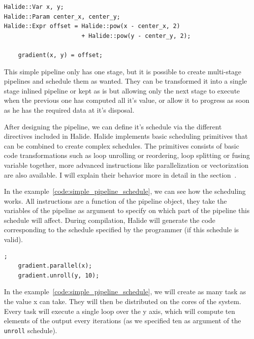 \lstset{basicstyle=\ttfamily\footnotesize,breaklines=true,tabsize=2}
\begin{lstlisting}[caption={Simple Pipeline Example}, captionpos=b, label={code:simple_pipeline}]
Halide::Var x, y;
Halide::Param center_x, center_y;
Halide::Expr offset = Halide::pow(x - center_x, 2) 
                      + Halide::pow(y - center_y, 2);

	gradient(x, y) = offset;
\end{lstlisting}


	This simple pipeline only has one stage, but it is possible to create multi-stage pipelines and schedule them as wanted. They can be transformed it into a single stage inlined pipeline or kept as is but allowing only the next stage to execute when the previous one has computed all it's value, or allow it to progress as soon as he has the required data at it's disposal.

	After designing the  pipeline, we can define it's schedule via the different directives included in Halide. Halide implements basic scheduling primitives that can be combined to create complex schedules. The primitives consists of basic code transformations such as loop unrolling or reordering, loop splitting or fusing variable together, more advanced instructions like parallelization or vectorization are also available. I will explain their behavior more in detail in the section~.


	In the example~\ref{code:simple_pipeline_schedule}, we can see how the scheduling works. All instructions are a function of the pipeline object, they take the variables of the pipeline as argument to specify on which part of the pipeline this schedule will affect. During compilation, Halide will generate the code corresponding to the schedule specified by the programmer (if this schedule is valid).

	\begin{lstlisting}[caption={Simple Pipeline Example}, captionpos=b,label={code:simple_pipeline_schedule}];
	gradient.parallel(x);
	gradient.unroll(y, 10);
	\end{lstlisting}

	In the example~\ref{code:simple_pipeline_schedule}, we will create as many task as the value x can take. They will then be distributed on the cores of the system. Every task will execute a single loop over the y axis, which will compute ten elements of the output every iterations (as we specified ten as argument of the \verb|unroll| schedule).

